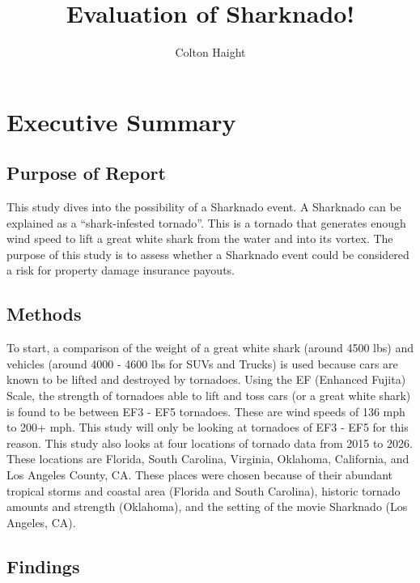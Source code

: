 \documentclass[
  letterpaper,
  DIV=11,
  numbers=noendperiod]{scrreprt}
\title{Evaluation of Sharknado!}
\author{Colton Haight}
\date{}
\renewcommand*\contentsname{Table of contents}
\newcommand\contentsname{Table of contents}
\begin{document}
\maketitle

\renewcommand*\contentsname{Table of contents}
{
\hypersetup{linkcolor=}
\setcounter{tocdepth}{2}
\tableofcontents
}


\chapter{Executive Summary}\label{executive-summary}

\section{Purpose of Report}\label{purpose-of-report}

This study dives into the possibility of a Sharknado event. A Sharknado
can be explained as a ``shark-infested tornado''. This is a tornado that
generates enough wind speed to lift a great white shark from the water
and into its vortex. The purpose of this study is to assess whether a
Sharknado event could be considered a risk for property damage insurance
payouts.

\section{Methods}\label{methods}

To start, a comparison of the weight of a great white shark (around 4500
lbs) and vehicles (around 4000 - 4600 lbs for SUVs and Trucks) is used
because cars are known to be lifted and destroyed by tornadoes. Using
the EF (Enhanced Fujita) Scale, the strength of tornadoes able to lift
and toss cars (or a great white shark) is found to be between EF3 - EF5
tornadoes. These are wind speeds of 136 mph to 200+ mph. This study will
only be looking at tornadoes of EF3 - EF5 for this reason. This study
also looks at four locations of tornado data from 2015 to 2026. These
locations are Florida, South Carolina, Virginia, Oklahoma, California,
and Los Angeles County, CA. These places were chosen because of their
abundant tropical storms and coastal area (Florida and South Carolina),
historic tornado amounts and strength (Oklahoma), and the setting of the
movie Sharknado (Los Angeles, CA).

\section{Findings}\label{findings}
\end{document}
